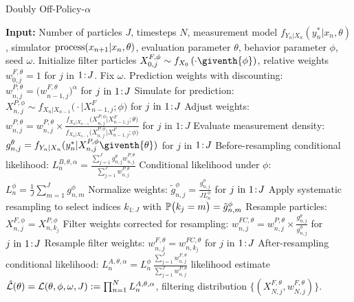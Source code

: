 \documentclass{article}
\begin{document}
\begin{algorithm}[H]
\centering
	\caption{Doubly Off-Policy-$\alpha$}
    \label{alg:dop}
	\begin{algorithmic}[1]
	     \STATE \textbf{Input:} Number of particles $J$, timesteps $N$, measurement model $f_{Y_n|X_n}(y_n^*|x_n, \theta)$, simulator $\text{process}(x_{n+1}|x_n, \theta)$, evaluation parameter $\theta$, behavior parameter $\phi$, seed $\omega$.
		\STATE Initialize filter particles ${X}_{0,j}^{F,\phi}\sim {f}_{{X}_{0}}\left(\cdot\giventh{\phi}\right)$, relative weights $w^{F,\theta}_{0,j}= 1$ for $j$ in ${1}\!:\!{J}$. Fix $\omega.$
            \STATE Prediction weights with discounting: $w_{n,j}^{P,\theta} = \big(w_{n-1,j}^{F,\theta}\big)^\alpha$ for $j\ \mathrm{in}\ {1}\!:\!{J}$
            \label{dop-alpha:discount}
            \STATE Simulate for prediction:
            ${X}_{n,j}^{P,\phi}\sim {f}_{{X}_{n}|{X}_{n-1}}\big(\cdot|{X}_{n-1,j}^{F};{\phi}\big)$ for $j\ \mathrm{in}\ {1}\!:\!{J}$ \label{dop-alpha:step1}
            \STATE Adjust weights: $\displaystyle w_{n,j}^{P,\theta} = w_{n,j}^{P,\theta} \times
            \frac{{f}_{{X}_{n}|{X}_{n-1}}\big({X}_{n,j}^{P,\phi}|{X}_{n-1,j}^{F};{\theta}\big)}{{f}_{{X}_{n}|{X}_{n-1}}\big({X}_{n,j}^{P,\phi}|{X}_{n-1,j}^{F};{\phi}\big)}$ for $j$ in $1:J$
            \label{dop-alpha:dproc}
            \STATE Evaluate measurement density:
            $g^{\theta}_{n,j}={f}_{{Y}_{n}|{X}_{n}}(y_{n}^{*}|{X}_{n,j}^{P,\phi}\giventh{\theta})$ for $j$ in ${1}\!:\!{J}$
            \STATE Before-resampling conditional likelihood: $\displaystyle L_n^{B,\theta,\alpha} = \frac{\sum_{j=1}^Jg^\theta_{n,j} w^{P,\theta}_{n,j}}{\sum_{j=1}^J  w^{P,\theta}_{n,j}}$
            \STATE Conditional likelihood under $\phi$: 
            $L_n^{\phi} = \frac{1}{J}\sum_{m=1}^{J}g^{\phi}_{n,m}$
            \label{dop-alpha:Lphi}
            \STATE Normalize weights:
            $\displaystyle \tilde{g}^{\phi}_{n,j}= \frac{g^{\phi}_{n,j}}{JL_n^{\phi}}$
            for $j\ \mathrm{in}\ {1}\!:\!{J}$
            \STATE Apply systematic resampling to select indices $k_{1:J}$ with $\mathbb{P}\big(k_{j}=m\big) =\tilde{g}^{\phi}_{n,m}$ \label{dop-alpha:systematic}
            \STATE Resample particles: ${X}_{n,j}^{F,\phi}={X}_{n,k_{j}}^{P,\phi}$
            \STATE Filter weights corrected for resampling:
            $\displaystyle w^{FC,\theta}_{n,j}= w^{P,\theta}_{n,j} \times \frac{ g^{\theta}_{n,j}}{ g^{\phi}_{n,j}}$ for $j\ \mathrm{in}\ {1}\!:\!{J}$ \label{dop-alpha:weight:update}
            \STATE Resample filter weights:
            $w_{n,j}^{F,\theta}= {w}_{n,k_{j}}^{FC,\theta}$
            for $j$ in ${1}\!:\!{J}$ \label{dop-alpha:step2}
            \STATE After-resampling conditional likelihood: $\displaystyle L_n^{A,\theta,\alpha} = L_n^\phi \, \frac{\sum_{j=1}^J w^{F,\theta}_{n,j}}{\sum_{j=1}^J  w^{P,\theta}_{n,j}}$
            \ENDFOR
		\RETURN likelihood estimate $\hat{\mathcal{L}}(\theta) = \mathcal{L}(\theta, \phi, \omega, J) := \prod_{n=1}^N L_n^{A,\theta,\alpha}$, filtering distribution $\{(X_{N,j}^{F, \theta}, w^{F,\theta}_{N,j})\}.$
	\end{algorithmic}
\end{algorithm}
\end{document}
